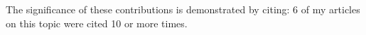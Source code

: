 The significance of these contributions is demonstrated by citing: 6 of my articles on this topic were cited 10 or more times.
